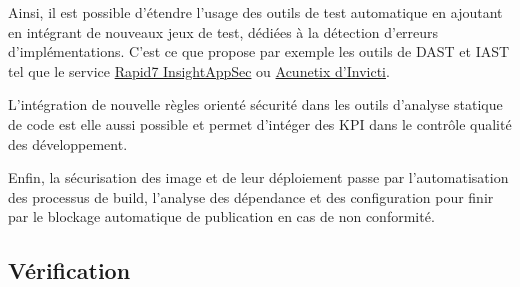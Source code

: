 Ainsi, il est possible d'étendre l'usage des outils de test automatique en ajoutant en intégrant de nouveaux jeux de test, dédiées à la 
détection d'erreurs d'implémentations.
C'est ce que propose par exemple les outils de \ac{DAST}  et \ac{IAST} tel que le service 
\href{https://www.rapid7.com/products/insightappsec/}{Rapid7 InsightAppSec} ou \href{https://www.acunetix.com/}{Acunetix d'Invicti}.

L'intégration de nouvelle règles orienté sécurité dans les outils d'analyse statique de code est elle aussi possible et permet d'intéger
des \ac{KPI} dans le contrôle qualité des développement.

Enfin, la sécurisation des image et de leur déploiement passe par l'automatisation des processus de build, l'analyse des dépendance et des
configuration pour finir par le blockage automatique de publication en cas de non conformité.

\subsection{Vérification}
